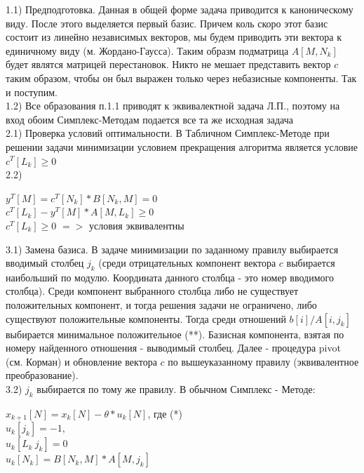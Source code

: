 \documentclass{article}
\begin{document}
    1.1) Предподготовка. Данная в общей форме задача приводится к каноническому виду. После этого выделяется первый базис. Причем коль скоро этот базис состоит из линейно независимых векторов, мы будем приводить эти вектора к единичному виду (м. Жордано-Гаусса). Таким образм подматрица $A[M, N_k]$ будет являтся матрицей перестановок. Никто не мешает представить вектор $c$ таким образом, чтобы он был выражен только через небазисные компоненты. Так и поступим. \\

    1.2) Все образования п.1.1 приводят к эквивалектной задача Л.П., поэтому на вход обоим Симплекс-Методам подается все та же исходная задача\\

    2.1) Проверка условий оптимальности. В Табличном Симплекс-Методе при решении задачи минимизации условием прекращения алгоритма является условие $c^T[L_k] \geq 0$ \\

    2.2)
    \begin{center}
        $y^T[M] = c^T[N_k] * B[N_k, M] = 0$ \\
         $c^T[L_k] - y^T[M] * A[M, L_k] \geq 0$ \\
         $c^T[L_k] \geq 0$
         $=>$ условия эквивалентны \\
    \end{center}


    3.1) Замена базиса. В задаче минимизации по заданному правилу выбирается вводимый столбец $j_k$ (среди отрицательных компонент вектора $c$ выбирается наибольший по модулю. Координата данного столбца - это номер вводимого столбца). Среди компонент выбранного столбца либо не существует положительных компонент, и тогда решения задачи не ограничено, либо существуют положительные компоненты. Тогда среди отношений $b[i]/ A[i, j_k]$ выбирается минимальное положительное (**). Базисная компонента, взятая по номеру найденного отношения  - выводимый столбец. Далее - процедура pivot (см. Корман) и обновление вектора $c$ по вышеуказанному правилу (эквивалентное преобразование). \\

    3.2) $j_k$ выбирается по тому же правилу. В обычном Симплекс - Методе:
    \begin{center}
        $x_{k+1}[N] = x_k[N] - \theta * u_k[N]$, где (*) \\
        $u_k[j_k] = -1$, \\
        $u_k[L_k \ j_k] = 0$\\
        $u_k[N_k] = B[N_k, M] * A[M, j_k]$
    \end{center}
\end{document}
